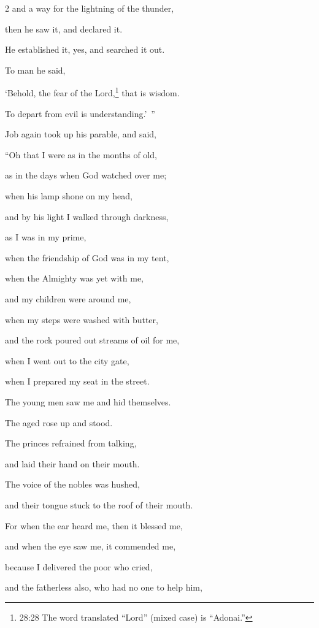 \begin{multicols}{2}
	and a way for the lightning of the thunder,
	
	\myverse{}then he saw it, and declared it.
	
	He established it, yes, and searched it out.
	
	\myverse{}To man he said,
	
	‘Behold, the fear of the Lord,\footnote{28:28 The word translated “Lord” (mixed case) is “Adonai.”
	} that is wisdom.
	
	To depart from evil is understanding.’ ”
	
	
	
	\mychapter{} \myverse*{}Job again took up his parable, and said,
	
\quad\quad \myverse{}“Oh that I were as in the months of old,
	
	as in the days when God watched over me;
	
	\myverse{}when his lamp shone on my head,
	
	and by his light I walked through darkness,
	
	\myverse{}as I was in my prime,
	
	when the friendship of God was in my tent,
	
	\myverse{}when the Almighty was yet with me,
	
	and my children were around me,
	
	\myverse{}when my steps were washed with butter,
	
	and the rock poured out streams of oil for me,
	
	\myverse{}when I went out to the city gate,
	
	when I prepared my seat in the street.
	
	\myverse{}The young men saw me and hid themselves.
	
	The aged rose up and stood.
	
	\myverse{}The princes refrained from talking,
	
	and laid their hand on their mouth.
	
	\myverse{}The voice of the nobles was hushed,
	
	and their tongue stuck to the roof of their mouth.
	
	\myverse{}For when the ear heard me, then it blessed me,
	
	and when the eye saw me, it commended me,
	
	\myverse{}because I delivered the poor who cried,
	
	and the fatherless also, who had no one to help him,
	

\end{multicols}
